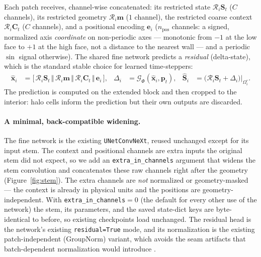 \documentclass[11pt]{article}
\newcommand{\Rop}{\mathcal{R}}
\newcommand{\Gfine}{\mathcal{G}_{\Phi}}
\newcommand{\code}[1]{\texttt{#1}}
\begin{document}
Each patch receives, channel-wise concatenated: its restricted state $\Rop_i\bm
S_t$ ($C$ channels), its restricted geometry $\Rop_i\bm m$ ($1$ channel), the
restricted coarse context $\Rop_i\bm C_t$ ($C$ channels), and a positional encoding
$\bm e_i$ ($n_{\text{pos}}$ channels: a signed, normalized axis \emph{coordinate}
on non-periodic axes --- monotonic from $-1$ at the low face to $+1$ at the high
face, not a distance to the nearest wall --- and a periodic $\sin$ signal otherwise). The shared fine network
predicts a \emph{residual} (delta-state), which is the standard stable choice for
learned time-steppers:
\begin{align}
\hat{\bm x}_i&=\big[\,\Rop_i\bm S_t\,\Vert\,\Rop_i\bm m\,\Vert\,\Rop_i\bm C_t\,\Vert\,\bm e_i\,\big],
&\Delta_i&=\Gfine(\hat{\bm x}_i,\bm p_t),
&\hat{\bm S}_i&=\big(\Rop_i\bm S_t+\Delta_i\big)\big|_{\Omega_i^\circ}.
\label{eq:fine}
\end{align}
The prediction is computed on the extended block and then cropped to the interior:
halo cells inform the prediction but their own outputs are discarded.

\paragraph{A minimal, back-compatible widening.}
The fine network is the existing \code{UNetConvNeXt}, reused unchanged except for
its input stem. The context and positional channels are extra inputs the original
stem did not expect, so we add an \code{extra\_in\_channels} argument that widens the
stem convolution and concatenates these raw channels right after the geometry
(Figure~\ref{fig:stem}). The extra channels are \emph{not} normalized or
geometry-masked --- the context is already in physical units and the positions are
geometry-independent. With \code{extra\_in\_channels}$=0$ (the default for every
other use of the network) the stem, its parameters, and the saved state-dict keys
are byte-identical to before, so existing checkpoints load unchanged. The residual
head is the network's existing \code{residual=True} mode, and its normalization is
the existing patch-independent (GroupNorm) variant, which avoids the seam artifacts
that batch-dependent normalization would introduce \cite{buglakova2025tiling}.
\end{document}
